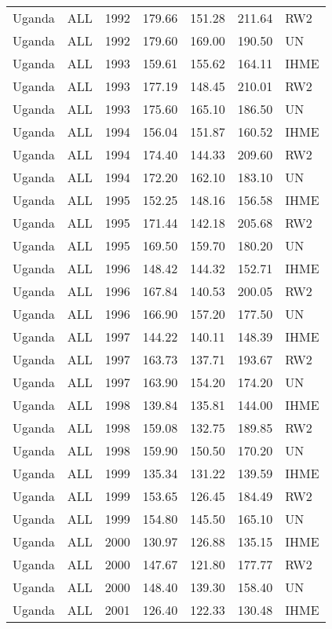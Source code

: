 \begin{longtable}{lllrrrl}
  Uganda & ALL & 1992 & 179.66 & 151.28 & 211.64 & RW2 \\ 
  Uganda & ALL & 1992 & 179.60 & 169.00 & 190.50 & UN \\ 
  Uganda & ALL & 1993 & 159.61 & 155.62 & 164.11 & IHME \\ 
  Uganda & ALL & 1993 & 177.19 & 148.45 & 210.01 & RW2 \\ 
  Uganda & ALL & 1993 & 175.60 & 165.10 & 186.50 & UN \\ 
  Uganda & ALL & 1994 & 156.04 & 151.87 & 160.52 & IHME \\ 
  Uganda & ALL & 1994 & 174.40 & 144.33 & 209.60 & RW2 \\ 
  Uganda & ALL & 1994 & 172.20 & 162.10 & 183.10 & UN \\ 
  Uganda & ALL & 1995 & 152.25 & 148.16 & 156.58 & IHME \\ 
  Uganda & ALL & 1995 & 171.44 & 142.18 & 205.68 & RW2 \\ 
  Uganda & ALL & 1995 & 169.50 & 159.70 & 180.20 & UN \\ 
  Uganda & ALL & 1996 & 148.42 & 144.32 & 152.71 & IHME \\ 
  Uganda & ALL & 1996 & 167.84 & 140.53 & 200.05 & RW2 \\ 
  Uganda & ALL & 1996 & 166.90 & 157.20 & 177.50 & UN \\ 
  Uganda & ALL & 1997 & 144.22 & 140.11 & 148.39 & IHME \\ 
  Uganda & ALL & 1997 & 163.73 & 137.71 & 193.67 & RW2 \\ 
  Uganda & ALL & 1997 & 163.90 & 154.20 & 174.20 & UN \\ 
  Uganda & ALL & 1998 & 139.84 & 135.81 & 144.00 & IHME \\ 
  Uganda & ALL & 1998 & 159.08 & 132.75 & 189.85 & RW2 \\ 
  Uganda & ALL & 1998 & 159.90 & 150.50 & 170.20 & UN \\ 
  Uganda & ALL & 1999 & 135.34 & 131.22 & 139.59 & IHME \\ 
  Uganda & ALL & 1999 & 153.65 & 126.45 & 184.49 & RW2 \\ 
  Uganda & ALL & 1999 & 154.80 & 145.50 & 165.10 & UN \\ 
  Uganda & ALL & 2000 & 130.97 & 126.88 & 135.15 & IHME \\ 
  Uganda & ALL & 2000 & 147.67 & 121.80 & 177.77 & RW2 \\ 
  Uganda & ALL & 2000 & 148.40 & 139.30 & 158.40 & UN \\ 
  Uganda & ALL & 2001 & 126.40 & 122.33 & 130.48 & IHME \\ 

\end{longtable}
